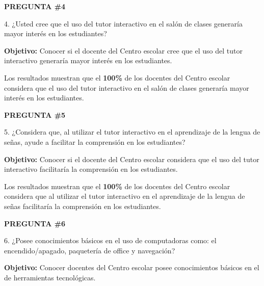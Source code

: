 \documentclass[12pt]{report}%
\begin{document}
\newpage
\textbf{PREGUNTA \#4}

4. ¿Usted cree que el uso del tutor interactivo en el salón de clases generaría mayor interés en los estudiantes?

\textbf{Objetivo:} Conocer si el docente del Centro escolar cree que el uso del tutor interactivo generaría mayor interés en los estudiantes.


\begin{center}
\end{center}


Los resultados muestran que el \textbf{ 100\%} de los docentes del Centro escolar considera que el uso del tutor interactivo en el salón de clases generaría mayor interés en los estudiantes.


\newpage
\textbf{PREGUNTA \#5}

5. ¿Considera que, al utilizar el tutor interactivo en el aprendizaje de la lengua de señas, ayude a facilitar la comprensión en los estudiantes?

\textbf{Objetivo:} Conocer si el docente del Centro escolar considera que el uso del tutor interactivo facilitaría la comprensión en los estudiantes.


\begin{center}
\end{center}


Los resultados muestran que el \textbf{ 100\%} de los docentes del Centro escolar considera que al utilizar el tutor interactivo en el aprendizaje de la lengua de señas facilitaría la comprensión en los estudiantes.


\newpage
\textbf{PREGUNTA \#6}

6. ¿Posee conocimientos básicos en el uso de computadoras como: el encendido/apagado, paquetería de office y navegación?

\textbf{Objetivo:} Conocer docentes del Centro escolar posee conocimientos básicos en el de herramientas tecnológicas.


\begin{center}
\end{center}
\end{document}
